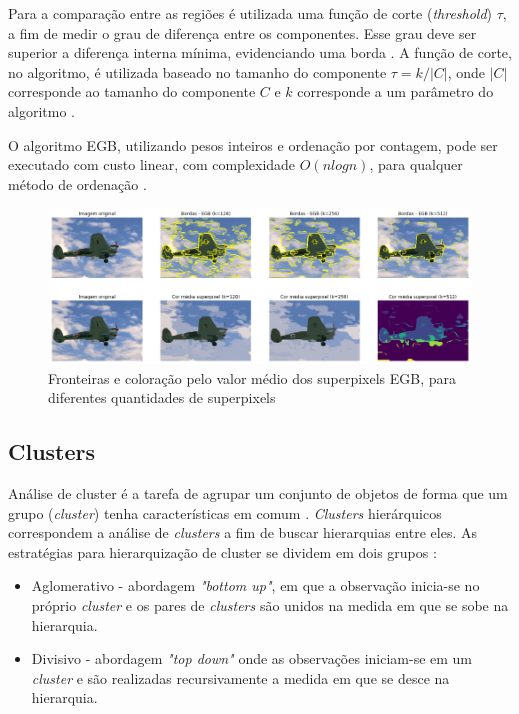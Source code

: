 \begin{document}
Para a comparação entre as regiões é utilizada uma função de corte (\textit{threshold}) $\tau$, a fim de medir o grau de diferença entre os componentes. Esse grau deve ser superior a diferença interna mínima, evidenciando uma borda \cite{FELZENSZWALB}. A função de corte, no algoritmo, é utilizada baseado no tamanho do componente $\tau=k/|C|$, onde $|C|$ corresponde ao tamanho do componente $C$ e $k$ corresponde a um parâmetro do algoritmo \cite{FELZENSZWALB}.

O algoritmo EGB, utilizando pesos inteiros e ordenação por contagem, pode ser executado com custo linear, com complexidade $O(nlogn)$, para qualquer método de ordenação \cite{FELZENSZWALB}. 

\begin{figure}[ht]
\centering
\includegraphics[width=1.\textwidth]{felz_segmentation_compare.png}
\caption{Fronteiras e coloração pelo valor médio dos superpixels EGB, para diferentes quantidades de superpixels}
\label{fig:EGB}
\end{figure}


\subsection{Clusters} \label{ssec:clusters}

Análise de cluster é a tarefa de agrupar um conjunto de objetos de forma que um grupo (\textit{cluster}) tenha características em comum \cite{WIKI_CLUSTER_ANALYSIS}. \textit{Clusters} hierárquicos correspondem a análise de \textit{clusters} a fim de buscar hierarquias entre eles. As estratégias para hierarquização de cluster se dividem em dois grupos \cite{ROKACH}:

\begin{itemize}
 \item Aglomerativo - abordagem \textit{"bottom up"}, em que a observação inicia-se no próprio \textit{cluster} e os pares de \textit{clusters} são unidos na medida em que se sobe na hierarquia. 
 \item Divisivo - abordagem \textit{"top down"} onde as observações iniciam-se em um \textit{cluster} e são realizadas recursivamente a medida em que se desce na hierarquia.
\end{itemize}
\end{document}
